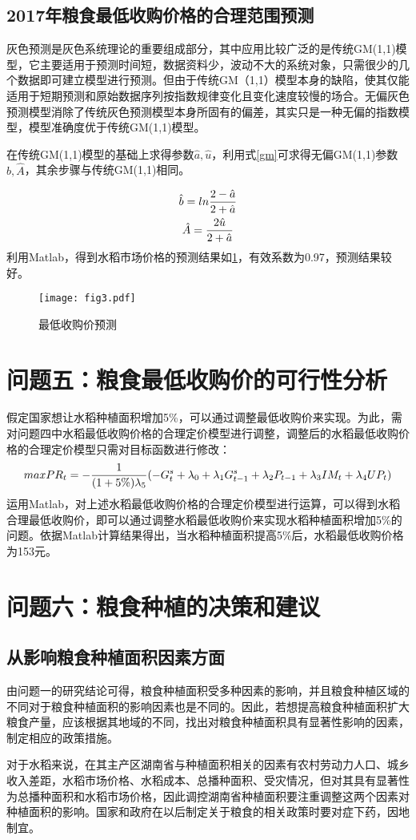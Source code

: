 \documentclass[withoutpreface,bwprint]{cumcmthesis} %
\begin{document}
\subsection{2017年粮食最低收购价格的合理范围预测}
灰色预测是灰色系统理论的重要组成部分，其中应用比较广泛的是传统GM(1,1)模型，它主要适用于预测时间短，数据资料少，波动不大的系统对象，只需很少的几个数据即可建立模型进行预测。但由于传统GM（1,1）模型本身的缺陷，使其仅能适用于短期预测和原始数据序列按指数规律变化且变化速度较慢的场合。无偏灰色预测模型消除了传统灰色预测模型本身所固有的偏差，其实只是一种无偏的指数模型，模型准确度优于传统GM(1,1)模型。\par
在传统GM(1,1)模型的基础上求得参数$\hat{a},\hat{u}$，利用式\ref{gm}可求得无偏GM(1,1)参数$\hat{b},\hat{A}$，其余步骤与传统GM(1,1)相同。\par
\begin{gather}
\label{gm}
\hat{b}=ln\frac{2-\hat{a}}{2+\hat{a}}\notag\\
\hat{A}=\frac{2\hat{u}}{2+\hat{a}}\notag
\end{gather}
利用Matlab，得到水稻市场价格的预测结果如\ref{fig:gm}，有效系数为0.97，预测结果较好。
\begin{figure}[!h]
    \centering
    \texttt{[image: fig3.pdf]}
    \caption{最低收购价预测}
    \label{fig:gm}
\end{figure}\par
\section{问题五：粮食最低收购价的可行性分析}
假定国家想让水稻种植面积增加5\%，可以通过调整最低收购价来实现。为此，需对问题四中水稻最低收购价格的合理定价模型进行调整，调整后的水稻最低收购价格的合理定价模型只需对目标函数进行修改：
\begin{gather}
max PR_{t}=-\frac{1}{(1+5\%)\lambda_{5}}(-G_{t}^{s}+\lambda_{0}+\lambda_{1}G_{t-1}^{s}+\lambda_{2}P_{t-1}+\lambda_{3}IM_{t}+\lambda_{4}UP_{t})\notag
\end{gather}
运用Matlab，对上述水稻最低收购价格的合理定价模型进行运算，可以得到水稻合理最低收购价，即可以通过调整水稻最低收购价来实现水稻种植面积增加5\%的问题。依据Matlab计算结果得出，当水稻种植面积提高5\%后，水稻最低收购价格为153元。

\section{问题六：粮食种植的决策和建议}
\subsection{从影响粮食种植面积因素方面}
由问题一的研究结论可得，粮食种植面积受多种因素的影响，并且粮食种植区域的不同对于粮食种植面积的影响因素也是不同的。因此，若想提高粮食种植面积扩大粮食产量，应该根据其地域的不同，找出对粮食种植面积具有显著性影响的因素，制定相应的政策措施。\par
对于水稻来说，在其主产区湖南省与种植面积相关的因素有农村劳动力人口、城乡收入差距，水稻市场价格、水稻成本、总播种面积、受灾情况，但对其具有显著性为总播种面积和水稻市场价格，因此调控湖南省种植面积要注重调整这两个因素对种植面积的影响。国家和政府在以后制定关于粮食的相关政策时要对症下药，因地制宜。
\end{document}
